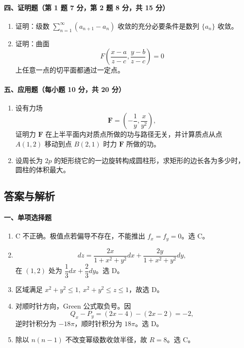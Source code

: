 \paragraph{四、证明题（第 1 题 7 分，第 2 题 8 分，共 15 分）}

\begin{enumerate}
  \item 证明：级数 $\sum_{n=1}^{\infty}(a_{n+1}-a_n)$ 收敛的充分必要条件是数列 $\{a_n\}$ 收敛。

  \item 证明：曲面
  \[
    F\left(\frac{x-a}{z-c},\frac{y-b}{z-c}\right)=0
  \]
  上任意一点的切平面都通过一定点。
\end{enumerate}

\paragraph{五、应用题（每小题 10 分，共 20 分）}

\begin{enumerate}
  \item 设有力场
  \[
    \mathbf F=\left(-\frac1y,\frac{x}{y^2}\right),
  \]
  证明力 $\mathbf F$ 在上半平面内对质点所做的功与路径无关，并计算质点从点 $A(1,2)$ 移动到点 $B(2,1)$ 时力 $\mathbf F$ 所做的功。

  \item 设周长为 $2p$ 的矩形绕它的一边旋转构成圆柱形，求矩形的边长各为多少时，圆柱的体积最大。
\end{enumerate}

\subsection{答案与解析}

\paragraph{一、单项选择题}
\begin{enumerate}
  \item C 不正确。极值点若偏导不存在，不能推出 $f_x=f_y=0$。选 C。
  \item
  \[
  dz=\frac{2x}{1+x^2+y^2}dx+\frac{2y}{1+x^2+y^2}dy,
  \]
  在 $(1,2)$ 处为 $\dfrac13dx+\dfrac23dy$。选 D。
  \item 区域满足 $x^2+y^2\le1,\ x^2+y^2\le z\le1$，故选 D。
  \item 对顺时针方向，Green 公式取负号。因
  \[
  Q_x-P_y=(2x-4)-(2x-2)=-2,
  \]
  逆时针积分为 $-18\pi$，顺时针积分为 $18\pi$。选 D。
  \item 除以 $n(n-1)$ 不改变幂级数收敛半径，故 $R=8$。选 C。
\end{enumerate}

